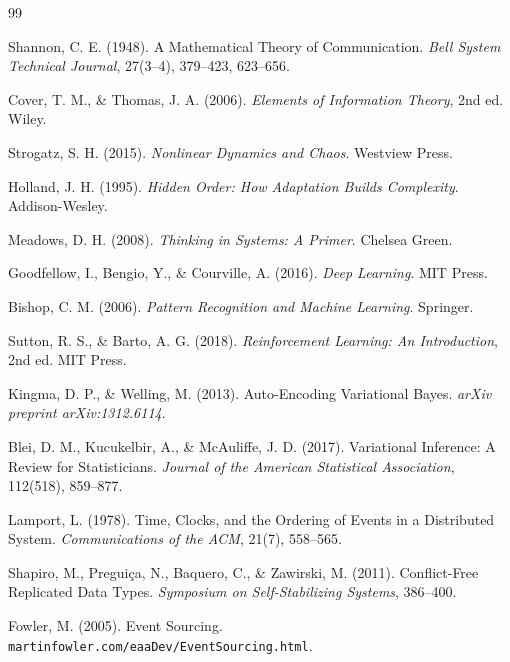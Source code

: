 \documentclass[11pt, a4paper]{article}
\theoremstyle{named}
\begin{document}
\begin{thebibliography}{99}

Shannon, C. E. (1948).
A Mathematical Theory of Communication.
\textit{Bell System Technical Journal}, 27(3--4), 379--423, 623--656.

Cover, T. M., \& Thomas, J. A. (2006).
\textit{Elements of Information Theory}, 2nd ed.
Wiley.

Strogatz, S. H. (2015).
\textit{Nonlinear Dynamics and Chaos}.
Westview Press.

Holland, J. H. (1995).
\textit{Hidden Order: How Adaptation Builds Complexity}.
Addison-Wesley.

Meadows, D. H. (2008).
\textit{Thinking in Systems: A Primer}.
Chelsea Green.

Goodfellow, I., Bengio, Y., \& Courville, A. (2016).
\textit{Deep Learning}.
MIT Press.

Bishop, C. M. (2006).
\textit{Pattern Recognition and Machine Learning}.
Springer.

Sutton, R. S., \& Barto, A. G. (2018).
\textit{Reinforcement Learning: An Introduction}, 2nd ed.
MIT Press.

Kingma, D. P., \& Welling, M. (2013).
Auto-Encoding Variational Bayes.
\textit{arXiv preprint arXiv:1312.6114}.

Blei, D. M., Kucukelbir, A., \& McAuliffe, J. D. (2017).
Variational Inference: A Review for Statisticians.
\textit{Journal of the American Statistical Association},
112(518), 859--877.

Lamport, L. (1978).
Time, Clocks, and the Ordering of Events in a Distributed System.
\textit{Communications of the ACM}, 21(7), 558--565.

Shapiro, M., Preguiça, N., Baquero, C., \& Zawirski, M. (2011).
Conflict-Free Replicated Data Types.
\textit{Symposium on Self-Stabilizing Systems}, 386--400.

Fowler, M. (2005).
Event Sourcing.
\texttt{martinfowler.com/eaaDev/EventSourcing.html}.


\end{thebibliography}
\end{document}
